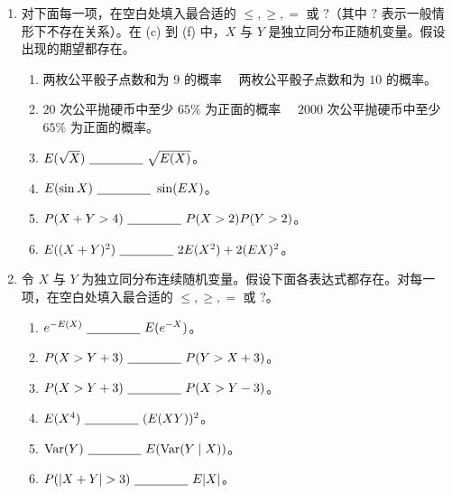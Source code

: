 \documentclass[UTF8,12pt,a4paper,fontset=fandol]{ctexart}
\begin{document}
\begin{enumerate}
  \item 对下面每一项，在空白处填入最合适的 $\le,\ge,=$ 或 $?$（其中 $?$ 表示一般情形下不存在关系）。在 (c) 到 (f) 中，$X$ 与 $Y$ 是独立同分布正随机变量。假设出现的期望都存在。
  \begin{enumerate}
    \item 两枚公平骰子点数和为 $9$ 的概率 \ \underline{\hspace{1.5cm}}\ 两枚公平骰子点数和为 $10$ 的概率。
    \item $20$ 次公平抛硬币中至少 $65\%$ 为正面的概率 \ \underline{\hspace{1.5cm}}\ $2000$ 次公平抛硬币中至少 $65\%$ 为正面的概率。
    \item $E(\sqrt X)\ \underline{\hspace{1.5cm}}\ \sqrt{E(X)}$。
    \item $E(\sin X)\ \underline{\hspace{1.5cm}}\ \sin(EX)$。
    \item $P(X+Y>4)\ \underline{\hspace{1.5cm}}\ P(X>2)P(Y>2)$。
    \item $E((X+Y)^2)\ \underline{\hspace{1.5cm}}\ 2E(X^2)+2(EX)^2$。
  \end{enumerate}

  \item 令 $X$ 与 $Y$ 为独立同分布连续随机变量。假设下面各表达式都存在。对每一项，在空白处填入最合适的 $\le,\ge,=$ 或 $?$。
  \begin{enumerate}
    \item $e^{-E(X)}\ \underline{\hspace{1.5cm}}\ E(e^{-X})$。
    \item $P(X>Y+3)\ \underline{\hspace{1.5cm}}\ P(Y>X+3)$。
    \item $P(X>Y+3)\ \underline{\hspace{1.5cm}}\ P(X>Y-3)$。
    \item $E(X^4)\ \underline{\hspace{1.5cm}}\ (E(XY))^2$。
    \item $\operatorname{Var}(Y)\ \underline{\hspace{1.5cm}}\ E(\operatorname{Var}(Y\mid X))$。
    \item $P(|X+Y|>3)\ \underline{\hspace{1.5cm}}\ E|X|$。
  \end{enumerate}


\end{enumerate}
\end{document}
